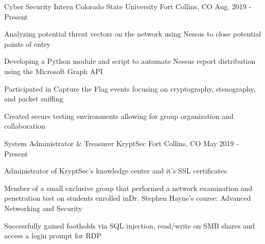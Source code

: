 \vspace{-5.0mm}


\begin{cventries}

  \cventry
    {Cyber Security Intern} %
    {Colorado State University} %
    {Fort Collins, CO} %
    {Aug. 2019 - Present} %
    {
      \begin{cvitems} %
        \item {Analyzing potential threat vectors on the network using Nessus to close potential points of entry}
        \item {Developing a Python module and script to automate Nessus report distribution using the Microsoft Graph API}
        \item {Participated in Capture the Flag events focusing on cryptography, stenography, and packet sniffing}
        \item {Created secure testing environments allowing for group organization and collaboration}
      \end{cvitems}
    }

  \cventry
    {System Administrator \& Treasurer} %
    {KryptSec} %
    {Fort Collins, CO} %
    {May 2019 - Present} %
    {
      \begin{cvitems} %
        \item {Administrator of KryptSec’s knowledge center and it’s SSL certificates}
        \item {Member of a small exclusive group that performed a network examination and penetration test on students enrolled inDr. Stephen Hayne’s course: Advanced Networking and Security}
        \item {Successfully gained footholds via SQL injection, read/write on SMB shares and access a login prompt for RDP}
      \end{cvitems}
    }


\end{cventries}
